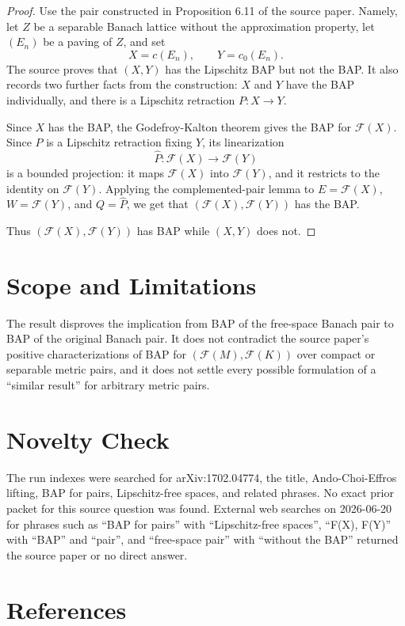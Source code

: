 \documentclass[11pt]{article}
\newcommand{\F}{\mathscr F}
\begin{document}
\begin{proof}
Use the pair constructed in Proposition 6.11 of the source paper. Namely, let
\(Z\) be a separable Banach lattice without the approximation property, let
\((E_n)\) be a paving of \(Z\), and set
\[
 X=c(E_n),\qquad Y=c_0(E_n).
\]
The source proves that \((X,Y)\) has the Lipschitz BAP but not the BAP. It also
records two further facts from the construction: \(X\) and \(Y\) have the BAP
individually, and there is a Lipschitz retraction \(P:X\to Y\).

Since \(X\) has the BAP, the Godefroy-Kalton theorem gives the BAP for
\(\F(X)\). Since \(P\) is a Lipschitz retraction fixing \(Y\), its
linearization
\[
 \widehat P:\F(X)\to\F(Y)
\]
is a bounded projection: it maps \(\F(X)\) into \(\F(Y)\), and it restricts to
the identity on \(\F(Y)\). Applying the complemented-pair lemma to
\(E=\F(X)\), \(W=\F(Y)\), and \(Q=\widehat P\), we get that
\((\F(X),\F(Y))\) has the BAP.

Thus \((\F(X),\F(Y))\) has BAP while \((X,Y)\) does not.
\end{proof}

\section*{Scope and Limitations}

The result disproves the implication from BAP of the free-space Banach pair to
BAP of the original Banach pair. It does not contradict the source paper's
positive characterizations of BAP for \((\F(M),\F(K))\) over compact or
separable metric pairs, and it does not settle every possible formulation of a
``similar result'' for arbitrary metric pairs.

\section*{Novelty Check}

The run indexes were searched for arXiv:1702.04774, the title,
Ando-Choi-Effros lifting, BAP for pairs, Lipschitz-free spaces, and related
phrases. No exact prior packet for this source question was found. External
web searches on 2026-06-20 for phrases such as
``BAP for pairs'' with ``Lipschitz-free spaces'', ``F(X), F(Y)'' with
``BAP'' and ``pair'', and ``free-space pair'' with ``without the BAP'' returned
the source paper or no direct answer.

\section*{References}
\end{document}
